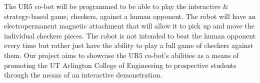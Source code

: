 
The UR5 co-bot will be programmed to be able to play the interactive \& strategy-based game, checkers, against a human opponent. The robot will have an electropermanent magnetic attachment that will allow it to pick up and move the individual checkers pieces. The robot is not intended to beat the human opponent every time but rather just have the ability to play a full game of checkers against them. Our project aims to showcase the UR5 co-bot's abilities as a means of promoting the UT Arlington College of Engineering to prospective students through the means of an interactive demonstration.
